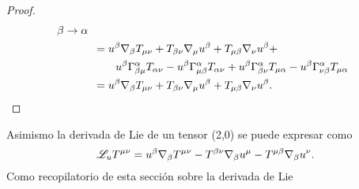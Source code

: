 \begin{proof}
\begin{equation}
\begin{aligned}
{\begin{array}{l}
                                                                                                                                                                                                                                                                                                   \beta \rightarrow \alpha
                                                                                                                                                                                                                                                                                               \end{array}} \\
                                      & =  u^\beta \mathbf{\nabla}_\beta T_{\mu \nu}+T_{\beta \nu}\mathbf{\nabla}_\mu u^\beta +T_{\mu \beta } \mathbf{\nabla}_\nu u^\beta +                                                                                                                                                            \\
                                      & \qquad u^\beta \Gamma_{\beta \mu}^\alpha T_{\alpha \nu}-u^\beta \Gamma^\alpha_{\mu \beta}T_{\alpha \nu} + u^\beta \Gamma_{\beta \nu}^\alpha T_{\mu \alpha}- u^\beta \Gamma^\alpha_{\nu \beta}T_{\mu \alpha }                                                                    \\
                                      & = u^\beta \mathbf{\nabla}_\beta T_{\mu \nu}+T_{\beta \nu}\mathbf{\nabla}_\mu u^\beta +T_{\mu \beta } \mathbf{\nabla}_\nu u^\beta.
        \end{aligned}
    \end{equation}
\end{proof}
\noindent Asimismo la derivada de Lie de un tensor (2,0) se puede expresar como
\begin{equation}
    \mathscr{L}_u T^{\mu \nu} = u^\beta \mathbf{\nabla}_\beta T^{\mu \nu}-T^{\beta \nu}\mathbf{\nabla}_\beta u^\mu - T^{\mu \beta } \mathbf{\nabla}_\beta u^\nu.
\end{equation}
Como recopilatorio de esta sección sobre la derivada de Lie


